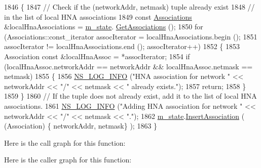 \begin{DoxyCode}
1846 \{
1847   \textcolor{comment}{// Check if the (networkAddr, netmask) tuple already exist}
1848   \textcolor{comment}{// in the list of local HNA associations}
1849   \textcolor{keyword}{const} \hyperlink{namespacens3_1_1olsr_a7aefab4ffae5b289262125647510a2ef}{Associations} &localHnaAssociations = \hyperlink{classns3_1_1olsr_1_1RoutingProtocol_a07942ec1a7df71b609c8d2ff3b567c49}{m\_state}.
      \hyperlink{classns3_1_1olsr_1_1OlsrState_af0d7450ccc6238bb018e8f22fcaf0552}{GetAssociations} ();
1850   \textcolor{keywordflow}{for} (Associations::const\_iterator assocIterator = localHnaAssociations.begin ();
1851        assocIterator != localHnaAssociations.end (); assocIterator++)
1852     \{
1853       Association \textcolor{keyword}{const} &localHnaAssoc = *assocIterator;
1854       \textcolor{keywordflow}{if} (localHnaAssoc.networkAddr == networkAddr && localHnaAssoc.netmask == netmask)
1855         \{
1856           \hyperlink{group__logging_gafbd73ee2cf9f26b319f49086d8e860fb}{NS\_LOG\_INFO} (\textcolor{stringliteral}{"HNA association for network "} << networkAddr << \textcolor{stringliteral}{"/"} << netmask << \textcolor{stringliteral}{"
       already exists."});
1857           \textcolor{keywordflow}{return};
1858         \}
1859     \}
1860   \textcolor{comment}{// If the tuple does not already exist, add it to the list of local HNA associations.}
1861   \hyperlink{group__logging_gafbd73ee2cf9f26b319f49086d8e860fb}{NS\_LOG\_INFO} (\textcolor{stringliteral}{"Adding HNA association for network "} << networkAddr << \textcolor{stringliteral}{"/"} << netmask << \textcolor{stringliteral}{"."});
1862   \hyperlink{classns3_1_1olsr_1_1RoutingProtocol_a07942ec1a7df71b609c8d2ff3b567c49}{m\_state}.\hyperlink{classns3_1_1olsr_1_1OlsrState_a4cdfceadaf69dda63b8fbe08d4ba5acc}{InsertAssociation} ( (Association) \{ networkAddr, netmask\} );
1863 \}
\end{DoxyCode}


Here is the call graph for this function\+:




Here is the caller graph for this function\+:


